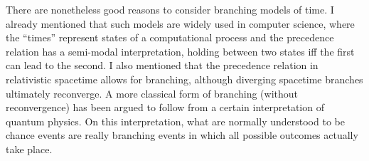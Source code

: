

There are nonetheless good reasons to consider branching models of time. I already
mentioned that such models are widely used in computer science, where
the ``times'' represent states of a computational process and the precedence
relation has a semi-modal interpretation, holding between two states iff the
first can lead to the second.
I also mentioned that the precedence relation in relativistic spacetime allows
for branching, although diverging spacetime branches ultimately reconverge. A
more classical form of branching (without reconvergence) has been argued to
follow from a certain interpretation of quantum physics. On this interpretation,
what are normally understood to be chance events are really branching events in
which all possible outcomes actually take place.

